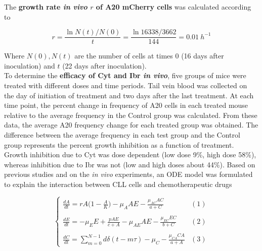 The \textbf{growth rate \textit{in vivo} $r$ of A20 mCherry cells} was calculated according to

\[ r = \frac{\ln{N(t)/N(0)}}{t} = \frac{\ln{16338/3662}}{144} = 0.01\ h^{-1} \]

Where $N(0), N(t)$ are the number of cells at times $0$ (16 days after inoculation) and $t$ (22 days after inoculation).\\
To determine the \textbf{efficacy of Cyt and Ibr \textit{in vivo}}, five groups of mice were treated with different doses and time periods. Tail vein blood was collected on the day of initiation of treatment and two days after the last treatment. 
At each time point, the percent change in frequency of A20 cells in each treated mouse relative to the average frequency in the Control group was calculated. From these data, the average A20 frequency change for each treated group was obtained. 
The difference between the average frequency in each test group and the Control group represents the percent growth inhibition as a function of treatment. Growth inhibition due to Cyt was dose dependent (low dose 9\%, high dose 58\%), whereas inhibition due to Ibr was not (low and high doses about 44\%).
Based on previous studies and on the \textit{in vivo} experiments, an ODE model was formulated to explain the interaction between CLL cells and chemotherapeutic drugs

\[
\begin{cases} 
	\frac{dA}{dt} = rA \bigl( 1 - \frac{A}{K} \bigr) - \mu_A AE - \frac{\mu_{AC} AC}{a+C} & (1)\\ \\
	\frac{dE}{dt} = -\mu_E E + \frac{pAE}{c+A} - \mu_{AE} AE - \frac{\mu_{EC} EC}{b+C} & (2) \\ \\
	\frac{dC}{dt} = \sum_{m=0}^{N-1} d\delta (t-m\tau) - \mu_{C} - \frac{\mu_{CA} CA}{a+A} & (3) 
\end{cases}
\]

